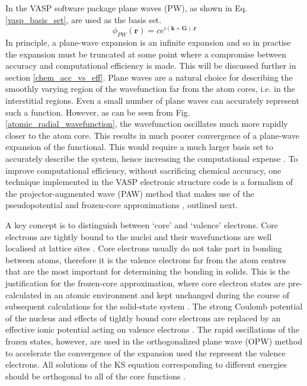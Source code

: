 \documentclass[11pt, twoside]{report}
\begin{document}
In the VASP software package \cite{VASP} plane waves (PW), as shown in Eq. \ref{vasp_basis_set}, are used as the basis set.
\begin{equation}\label{vasp_basis_set}
\phi_{PW}(\mathbf{r}) = ce^{i(\mathbf{k}+\mathbf{G}).\mathbf{r}}
\end{equation}
In principle, a plane-wave expansion is an infinite expansion and so in practise the expansion must be truncated at some point where a compromise between accuracy and computational efficiency is made. This will be discussed further in section \ref{chem_acc_vs_eff}. Plane waves are a natural choice for describing the smoothly varying region of the wavefunction far from the atom cores, i.e. in the interstitial regions. Even a small number of plane waves can accurately represent such a function. However, as can be seen from Fig. \ref{atomic_radial_wavefunction}, the wavefunction oscillates much more rapidly closer to the atom core. This results in much poorer convergence of a plane-wave expansion of the functional. This would require a much larger basis set to accurately describe the system, hence increasing the computational expense \cite{Prasad_ch5}. To improve computational efficiency, without sacrificing chemical accuracy, one technique implemented in the VASP electronic structure code is a formalism of the projector-augmented wave (PAW) method \cite{PAW} that makes use of the pseudopotential and frozen-core approximations \cite{PAW_VASP}, outlined next.

A key concept is to distinguish between `core' and `valence' electrons. Core electrons are tightly bound to the nuclei and their wavefunctions are well localised at lattice sites \cite{Prasad_ch5}. Core electrons usually do not take part in bonding between atoms, therefore it is the valence electrons far from the atom centres that are the most important for determining the bonding in solids. This is the justification for the frozen-core approximation, where core electron states are pre-calculated in an atomic environment and kept unchanged during the course of subsequent calculations for the solid-state system \cite{vasp_slides_PP1}. The strong Coulomb potential of the nucleus and effects of tightly bound core electrons are replaced by an effective ionic potential acting on valence electrons \cite{RichardMartin_Ch11}. The rapid oscillations of the frozen states, however, are used in the orthogonalized plane wave (OPW) method to accelerate the convergence of the expansion used the represent the valence electrons. All solutions of the KS equation corresponding to different energies should be orthogonal to all of the core functions \cite{Prasad_ch5}.
\end{document}
